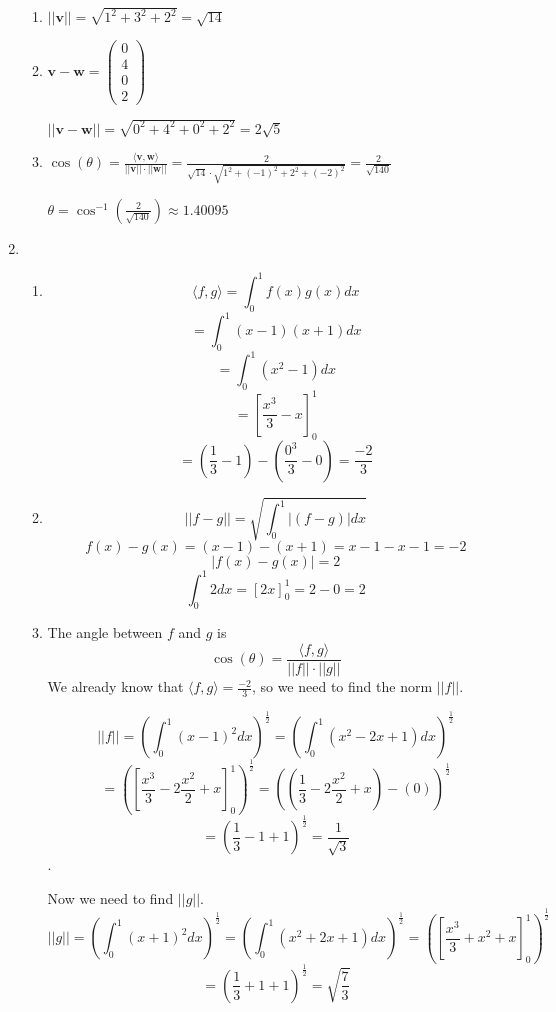 \documentclass[12pt]{article}
\begin{document}
\begin{enumerate}[leftmargin=0em]
\begin{enumerate}[leftmargin=!]
    \item $||\mathbf{v}|| = \sqrt{1^{2} + 3^{2} + 2^{2}} = \sqrt{14}$

    \item $\mathbf{v} - \mathbf{w} = \begin{pmatrix}
      0 \\
      4 \\
      0 \\
      2
    \end{pmatrix}$

    $||\mathbf{v} - \mathbf{w}|| = \sqrt{0^{2} + 4^{2} + 0^{2} + 2^{2}} = 2\sqrt{5}$

    \item $\cos(\theta) = \frac{\langle \mathbf{v}, \mathbf{w} \rangle}{||\mathbf{v}||\cdot||\mathbf{w}||} = \frac{2}{\sqrt{14} \cdot \sqrt{1^{2} + (-1)^{2} + 2^{2} + (-2)^{2}}} = \frac{2}{\sqrt{140}}$ 
    
    $\theta = \cos^{-1}(\frac{2}{\sqrt{140}}) \approx 1.40095$
  \end{enumerate}


  \item
  \begin{enumerate}[leftmargin=!]
    \item
    \[ \langle f, g \rangle = \int_{0}^{1}f(x)g(x)dx\]
    \[ = \int_{0}^{1}(x-1)(x+1)dx\]
    \[ = \int_{0}^{1}(x^2-1)dx\]
    \[ = [\frac{x^3}{3} - x]^{1}_0\]
    \[ = (\frac{1}{3} - 1) - (\frac{0^3}{3} - 0) = \frac{-2}{3}\]
    \item
    \[ || f - g || = \sqrt{\int_{0}^{1}|(f-g)|dx}\]
    \[ f(x) - g(x) = (x-1) - (x+1) = x - 1 - x - 1 = -2\]
    \[ |f(x) - g(x)| = 2\]
    \[ \int_{0}^{1}2dx = [2x]^{1}_0 = 2 - 0 = 2\]
    \item
    The angle between $f$ and $g$ is
    \[ \cos(\theta) = \frac{\langle f, g \rangle}{||f|| \cdot ||g||}\]
    We already know that $\langle f, g \rangle = \frac{-2}{3}$, so we need to find the norm $||f||$.

    \[||f|| = (\int_{0}^{1}(x-1)^2dx)^{\frac{1}{2}} = (\int_{0}^{1}(x^2-2x+1)dx)^{\frac{1}{2}}\]
    \[ = ([\frac{x^3}{3}-2\frac{x^2}{2} + x]^1_0)^\frac{1}{2} = ((\frac{1}{3} - 2\frac{x^2}{2} + x) - (0))^\frac{1}{2}\]
    \[ = (\frac{1}{3} - 1 +1)^{\frac{1}{2}} = \frac{1}{\sqrt{3}}\].

    Now we need to find $||g||$.
    \[ ||g|| = (\int_{0}^{1}(x+1)^2dx)^{\frac{1}{2}} = (\int_{0}^{1}(x^2+2x+1)dx)^{\frac{1}{2}} = ([\frac{x^3}{3} + x^{2} + x]^{1}_0)^{\frac{1}{2}}\]
    \[ = (\frac{1}{3} + 1 + 1)^\frac{1}{2} = \sqrt{\frac{7}{3}}\]


\end{enumerate}
\end{enumerate}
\end{document}
